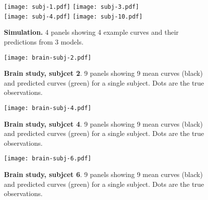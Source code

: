 \documentclass{article}
\begin{document}
\begin{figure}
  \begin{center}
    \texttt{[image: subj-1.pdf]}
    \texttt{[image: subj-3.pdf]}\\
    \texttt{[image: subj-4.pdf]}
    \texttt{[image: subj-10.pdf]}
  \end{center}
  \caption{\textbf{Simulation.} 4 panels showing 4 example curves and their predictions from 3 models.\label{fig:predictions}}
\end{figure}

 \begin{figure}
  \begin{center}
    \texttt{[image: brain-subj-2.pdf]}
  \end{center}
  \caption{\textbf{Brain study, subjcet 2}. 9 panels showing 9 mean curves (black) and predicted curves (green) for a single subject. Dots are the true observations. \label{fig:predictions-brain-subj2}}
\end{figure}

\begin{figure}
  \begin{center}
    \texttt{[image: brain-subj-4.pdf]}
  \end{center}
  \caption{\textbf{Brain study, subjcet 4}. 9 panels showing 9 mean curves (black) and predicted curves (green) for a single subject. Dots are the true observations. \label{fig:predictions-brain-subj4}}
\end{figure}

\begin{figure}
  \begin{center}
    \texttt{[image: brain-subj-6.pdf]}
  \end{center}
  \caption{\textbf{Brain study, subjcet 6}. 9 panels showing 9 mean curves (black) and predicted curves (green) for a single subject. Dots are the true observations. \label{fig:predictions-brain-subj6}}
\end{figure}
\end{document}
